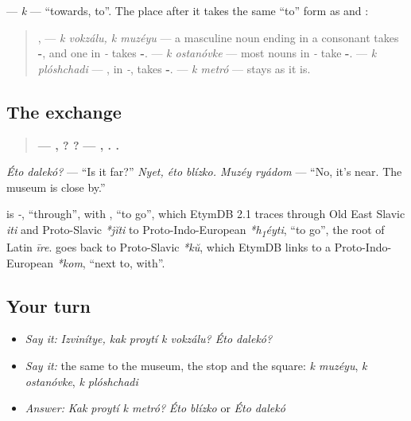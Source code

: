 \begin{grammarlens}[title={Grammar Lens: \ru{к} and the \textquotedblleft{}to\textquotedblright{} form}]
\textbf{} — \emph{k} — \textquotedblleft{}towards, to\textquotedblright{}. The place after it takes the same \textquotedblleft{}to\textquotedblright{} form as \emph{} and \emph{}:

\begin{quote}
\textbf{ }, \textbf{ } — \emph{k vokzálu, k muzéyu} — a masculine noun ending in a consonant takes \textbf{-}, and one in \emph{-} takes \textbf{-}. \textbf{ } — \emph{k ostanóvke} — most nouns in \emph{-} take \textbf{-}. \textbf{ } — \emph{k plóshchadi} — \emph{}, in \emph{-}, takes \textbf{-}. \textbf{ } — \emph{k metró} — \emph{} stays as it is.
\end{quote}
\end{grammarlens}

\subsection*{The exchange}
\begin{quote}
\textbf{— ,    ?  ?} \textbf{— ,  .  .}
\end{quote}

\emph{Éto dalekó?} — \textquotedblleft{}Is it far?\textquotedblright{} \emph{Nyet, éto blízko. Muzéy ryádom} — \textquotedblleft{}No, it's near. The museum is close by.\textquotedblright{}

\begin{cousinweb}
\textbf{} is \emph{-}, \textquotedblleft{}through\textquotedblright{}, with \textbf{}, \textquotedblleft{}to go\textquotedblright{}, which EtymDB 2.1 traces through Old East Slavic \emph{iti} and Proto-Slavic \emph{*jĭti} to Proto-Indo-European \emph{*h\textsubscript{1}éyti}, \textquotedblleft{}to go\textquotedblright{}, the root of Latin \emph{īre}. \textbf{} goes back to Proto-Slavic \emph{*kŭ}, which EtymDB links to a Proto-Indo-European \emph{*kom}, \textquotedblleft{}next to, with\textquotedblright{}.
\end{cousinweb}

\subsection*{Your turn}
\begin{itemize}
\raggedright
  \item \emph{Say it:} \emph{Izvinítye, kak proytí k vokzálu? Éto dalekó?}
  \item \emph{Say it:} the same to the museum, the stop and the square: \emph{k muzéyu}, \emph{k ostanóvke}, \emph{k plóshchadi}
  \item \emph{Answer:} \emph{Kak proytí k metró?} \emph{Éto blízko} or \emph{Éto dalekó}
\end{itemize}

